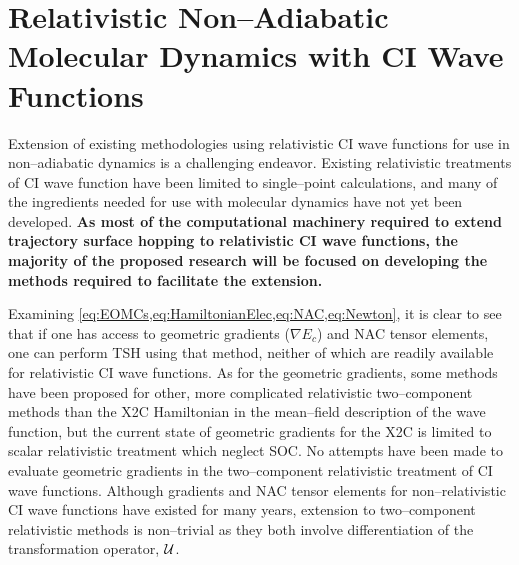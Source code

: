 \linespread{1.0}
\section{Relativistic Non--Adiabatic Molecular Dynamics with CI Wave Functions}
\linespread{1.5}
\label{sec:Future}

Extension of existing methodologies using relativistic CI wave functions for use
in non--adiabatic dynamics is a challenging endeavor. Existing relativistic
treatments of CI wave function have been limited to single--point calculations,
and many of the ingredients needed for use with molecular dynamics have not yet
been developed.
{\bf As most of the computational machinery required to extend trajectory
surface hopping to relativistic CI wave functions, the majority of the proposed
research will be focused on developing the methods required to facilitate the
extension.}

Examining \cref{eq:EOMCs,eq:HamiltonianElec,eq:NAC,eq:Newton}, it is clear to
see that if one has access to geometric gradients ($\nabla E_c$) and NAC tensor
elements, one can perform TSH using that method, neither of which are readily
available for relativistic CI wave functions. As for the geometric gradients,
some methods have been proposed for other, more complicated relativistic
two--component methods\cite{Nakai16_JCTC2181,Cremer15_JCP214106} than the X2C
Hamiltonian in the mean--field description of the wave function, but the current
state of geometric gradients for the X2C is limited to scalar relativistic
treatment which neglect SOC\cite{Gauss11_JCP084114}. No attempts have been made
to evaluate geometric gradients in the two--component relativistic treatment of
CI wave functions. Although gradients and NAC tensor elements for
non--relativistic CI wave functions have existed for many years, extension to
two--component relativistic methods is non--trivial as they both involve
differentiation of the transformation operator, $\mathcal{U}$.

